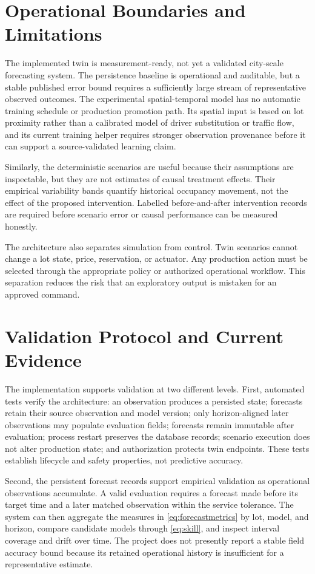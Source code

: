 \documentclass[conference]{IEEEtran}
\begin{document}
\section{Operational Boundaries and Limitations}

The implemented twin is measurement-ready, not yet a validated city-scale forecasting system. The persistence baseline is operational and auditable, but a stable published error bound requires a sufficiently large stream of representative observed outcomes. The experimental spatial-temporal model has no automatic training schedule or production promotion path. Its spatial input is based on lot proximity rather than a calibrated model of driver substitution or traffic flow, and its current training helper requires stronger observation provenance before it can support a source-validated learning claim.

Similarly, the deterministic scenarios are useful because their assumptions are inspectable, but they are not estimates of causal treatment effects. Their empirical variability bands quantify historical occupancy movement, not the effect of the proposed intervention. Labelled before-and-after intervention records are required before scenario error or causal performance can be measured honestly.

The architecture also separates simulation from control. Twin scenarios cannot change a lot state, price, reservation, or actuator. Any production action must be selected through the appropriate policy or authorized operational workflow. This separation reduces the risk that an exploratory output is mistaken for an approved command.

\section{Validation Protocol and Current Evidence}

The implementation supports validation at two different levels. First, automated tests verify the architecture: an observation produces a persisted state; forecasts retain their source observation and model version; only horizon-aligned later observations may populate evaluation fields; forecasts remain immutable after evaluation; process restart preserves the database records; scenario execution does not alter production state; and authorization protects twin endpoints. These tests establish lifecycle and safety properties, not predictive accuracy.

Second, the persistent forecast records support empirical validation as operational observations accumulate. A valid evaluation requires a forecast made before its target time and a later matched observation within the service tolerance. The system can then aggregate the measures in \eqref{eq:forecastmetrics} by lot, model, and horizon, compare candidate models through \eqref{eq:skill}, and inspect interval coverage and drift over time. The project does not presently report a stable field accuracy bound because its retained operational history is insufficient for a representative estimate.
\end{document}
